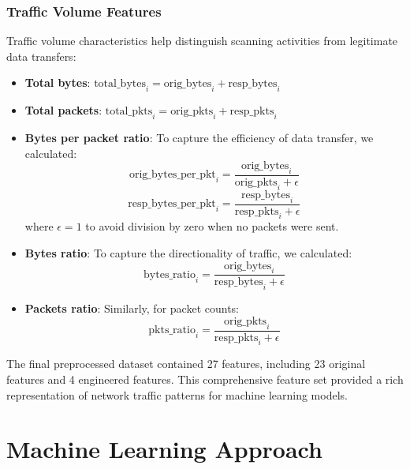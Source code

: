 \subsubsection{Traffic Volume Features}

Traffic volume characteristics help distinguish scanning activities from legitimate data transfers:

\begin{itemize}
    \item \textbf{Total bytes}: $\text{total\_bytes}_i = \text{orig\_bytes}_i + \text{resp\_bytes}_i$
    
    \item \textbf{Total packets}: $\text{total\_pkts}_i = \text{orig\_pkts}_i + \text{resp\_pkts}_i$
    
    \item \textbf{Bytes per packet ratio}: To capture the efficiency of data transfer, we calculated:
    \begin{equation}
        \text{orig\_bytes\_per\_pkt}_i = \frac{\text{orig\_bytes}_i}{\text{orig\_pkts}_i + \epsilon}
    \end{equation}
    \begin{equation}
        \text{resp\_bytes\_per\_pkt}_i = \frac{\text{resp\_bytes}_i}{\text{resp\_pkts}_i + \epsilon}
    \end{equation}
    where $\epsilon = 1$ to avoid division by zero when no packets were sent.
    
    \item \textbf{Bytes ratio}: To capture the directionality of traffic, we calculated:
    \begin{equation}
        \text{bytes\_ratio}_i = \frac{\text{orig\_bytes}_i}{\text{resp\_bytes}_i + \epsilon}
    \end{equation}
    
    \item \textbf{Packets ratio}: Similarly, for packet counts:
    \begin{equation}
        \text{pkts\_ratio}_i = \frac{\text{orig\_pkts}_i}{\text{resp\_pkts}_i + \epsilon}
    \end{equation}
\end{itemize}

The final preprocessed dataset contained 27 features, including 23 original features and 4 engineered features. This comprehensive feature set provided a rich representation of network traffic patterns for machine learning models.

\section{Machine Learning Approach}

